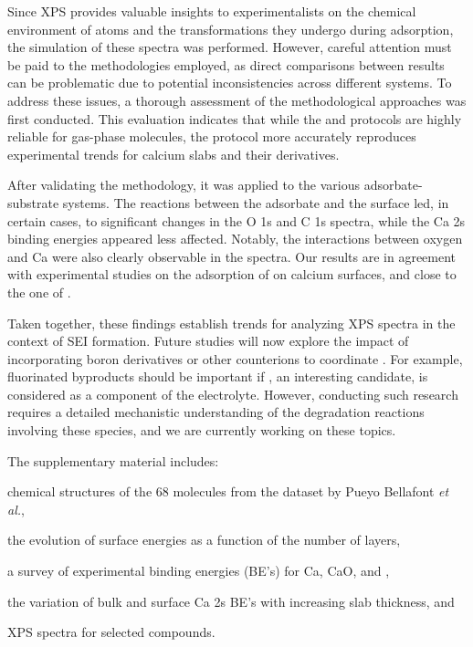 \documentclass[journal=jpccck,manuscript=article]{achemso}
\begin{document}
Since XPS provides valuable insights  to experimentalists on the chemical environment of atoms and the transformations they undergo during adsorption, the simulation of these spectra was performed. However, careful attention must be paid to the methodologies employed, as direct comparisons between results can be problematic due to potential inconsistencies across different systems. To address these issues, a thorough assessment of the methodological approaches was first conducted. This evaluation indicates that while the  and  protocols are highly reliable for gas-phase molecules, the  protocol more accurately reproduces experimental trends for calcium slabs and their derivatives.

After validating the methodology, it was applied to the various adsorbate-substrate systems. The reactions between the adsorbate and the surface led,  in certain cases, to significant changes in the O 1s and C 1s spectra, while the Ca 2s binding energies appeared less affected. Notably, the interactions between oxygen and Ca were also clearly observable in the spectra. Our results are in agreement with experimental studies on the adsorption of  on calcium surfaces, and close to the one of .\cite{voigtsAdsorptionCO2CO2009}

Taken together, these findings establish trends for analyzing XPS spectra in the context of SEI formation. Future studies will now explore the impact of incorporating boron derivatives or other counterions to coordinate . For example, fluorinated byproducts should be important if  , an interesting candidate,\cite{bodinBoronBasedFunctionalAdditives2023} is considered as a component of the electrolyte. However, conducting such research requires a detailed mechanistic understanding of the degradation reactions involving these species,\cite{youngPreventingElectrolyteDecomposition2021,yamijalaStabilityCalciumIon2021,baonguyenInvestigatingAbnormalConductivity2022,nguyenSolvationReductionCoupling2023} and we are currently working on these topics.

\clearpage

\begin{suppinfo}
	The supplementary material includes: \begin{inparaenum}[(i)]
		\item chemical structures of the 68 molecules from the dataset by Pueyo Bellafont \textit{et al.}\cite{pueyobellafontPredictingCoreLevel2017},
		\item the evolution of surface energies as a function of the number of layers,
		\item a survey of experimental binding energies (BE's) for Ca, CaO, and ,
		\item the variation of bulk and surface Ca 2s BE's with increasing slab thickness, and
		\item XPS spectra for selected compounds.
	\end{inparaenum}
\end{suppinfo}
\end{document}
